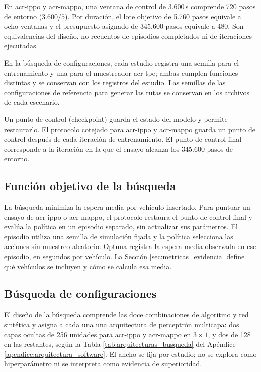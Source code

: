 En \acrshort{acr-ippo} y \acrshort{acr-mappo}, una ventana de control de 3.600\,s comprende 720 pasos de entorno ($3.600/5$). Por duración, el lote objetivo de 5.760 pasos equivale a ocho ventanas y el presupuesto asignado de 345.600 pasos equivale a 480. Son equivalencias del diseño, no recuentos de episodios completados ni de iteraciones ejecutadas.

En la búsqueda de configuraciones, cada estudio registra una semilla para el entrenamiento y una para el muestreador \acrshort{acr-tpe}; ambas cumplen funciones distintas y se conservan con los registros del estudio. Las semillas de las configuraciones de referencia para generar las rutas se conservan en los archivos de cada escenario.

Un punto de control (\gls{checkpoint}) guarda el estado del modelo y permite restaurarlo. El protocolo cotejado para \acrshort{acr-ippo} y \acrshort{acr-mappo} guarda un punto de control después de cada iteración de entrenamiento. El punto de control final corresponde a la iteración en la que el ensayo alcanza los 345.600 pasos de entorno.

\subsection{Función objetivo de la búsqueda}
\label{subsec:objetivo_busqueda}

La búsqueda minimiza la espera media por vehículo insertado. Para puntuar un ensayo de \acrshort{acr-ippo} o \acrshort{acr-mappo}, el protocolo restaura el punto de control final y evalúa la política en un episodio separado, sin actualizar sus parámetros. El episodio utiliza una semilla de simulación fijada y la política selecciona las acciones sin muestreo aleatorio. Optuna registra la espera media observada en ese episodio, en segundos por vehículo. La Sección \ref{sec:metricas_evidencia} define qué vehículos se incluyen y cómo se calcula esa media.

\subsection{Búsqueda de configuraciones}
\label{subsec:hpo_busqueda}

El diseño de la búsqueda comprende las doce combinaciones de algoritmo y red sintética y asigna a cada una una arquitectura de perceptrón multicapa: dos capas ocultas de 256 unidades para \acrshort{acr-ippo} y \acrshort{acr-mappo} en $3\times1$, y dos de 128 en las restantes, según la Tabla \ref{tab:arquitecturas_busqueda} del Apéndice \ref{apendice:arquitectura_software}. El ancho se fija por estudio; no se explora como hiperparámetro ni se interpreta como evidencia de superioridad.

